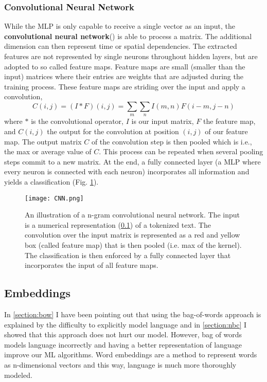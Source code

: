 \subsubsection{Convolutional Neural Network}
While the MLP is only capable to receive a single vector as an input, the \textbf{convolutional neural network}() is able to process a matrix. The additional dimension can then represent time or spatial dependencies. The extracted features are not represented by single neurons throughout hidden layers, but are adopted to so called feature maps. Feature maps are small (smaller than the input) matrices where their entries are weights that are adjusted during the training process. These feature maps are striding over the input and apply a convolution,
\[C(i,j) = (I \ast F)(i,j) = \sum_m \sum_n I(m, n) F(i-m, j-n)\] where $\ast$ is the convolutional operator, $I$ is our input matrix, $F$ the feature map, and $C(i,j)$ the output for the convolution at position $(i,j)$ of our feature map. The output matrix $C$ of the convolution step is then pooled which is i.e., the max or average value of $C$. This process can be repeated when several pooling steps commit to a new matrix. At the end, a fully connected layer (a MLP where every neuron is connected with each neuron) incorporates all information and yields a classification (Fig. \ref{fig:cnn}).
\begin{figure}[h!]
    \centering
    \texttt{[image: CNN.png]}
    \caption{An illustration of a n-gram convolutional neural network. The input is a numerical representation (\ref{section:embeddings}) of a tokenized text. The convolution over the input matrix is represented as a red and yellow box (called feature map) that is then pooled (i.e. max of the kernel). The classification is then enforced by a fully connected layer that incorporates the input of all feature maps.}
    \label{fig:cnn}
\end{figure}


\subsection{Embeddings}\label{section:embeddings}
In \ref{section:bow} I have been pointing out that using the bag-of-words approach is explained by the difficulty to explicitly model language and in \ref{section:nbc} I showed that this approach does not hurt our model. However, bag of words models language incorrectly and having a better representation of language improve our ML algorithms. Word embeddings are a method to represent words as n-dimensional vectors and this way, language is much more thoroughly modeled.
